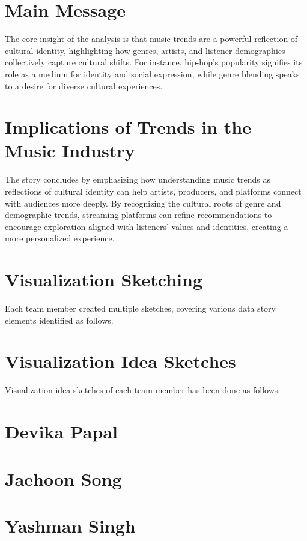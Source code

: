 \documentclass[12pt]{article}
\begin{document}
\section*{Main Message}
The core insight of the analysis is that music trends are a powerful reflection of cultural identity, highlighting how genres, artists, and listener demographics collectively capture cultural shifts. For instance, hip-hop's popularity signifies its role as a medium for identity and social expression, while genre blending speaks to a desire for diverse cultural experiences.

\section*{Implications of Trends in the Music Industry}
The story concludes by emphasizing how understanding music trends as reflections of cultural identity can help artists, producers, and platforms connect with audiences more deeply. By recognizing the cultural roots of genre and demographic trends, streaming platforms can refine recommendations to encourage exploration aligned with listeners' values and identities, creating a more personalized experience.

\section*{Visualization Sketching}
Each team member created multiple sketches, covering various data story elements identified as follows.

\section*{Visualization Idea Sketches}
Visualization idea sketches of each team member has been done as follows.

\section*{Devika Papal}

\section*{Jaehoon Song}

\section*{Yashman Singh}
\end{document}
